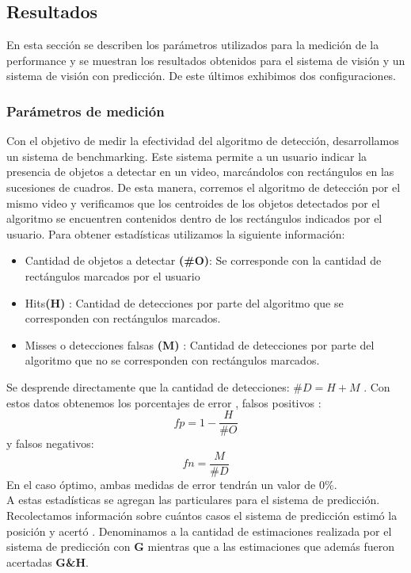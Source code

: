 	
	
\subsection{Resultados}
En esta sección se describen los parámetros utilizados para la 
medición de la performance y se muestran los resultados obtenidos para 
el sistema de visión y un sistema de visión con predicción. De este 
últimos exhibimos dos configuraciones.

\subsubsection{Parámetros de medición}
Con el objetivo de  medir la efectividad del algoritmo de detección, desarrollamos un sistema de benchmarking. Este sistema permite
a un usuario indicar la presencia de objetos a detectar en un video, marcándolos con rectángulos en las sucesiones de cuadros. De esta
manera, corremos el algoritmo de detección por el mismo video y verificamos que los centroides de los objetos detectados por el algoritmo 
se encuentren contenidos dentro de los rectángulos indicados por el 
usuario.  Para obtener estadísticas utilizamos la siguiente información:
\begin{itemize}
\item { Cantidad de objetos a detectar \textbf{(\#O)}: Se corresponde con la cantidad de rectángulos marcados por el usuario}
\item { Hits\textbf{(H)} : Cantidad de detecciones por parte del algoritmo que se corresponden con rectángulos marcados.}
\item { Misses o detecciones falsas \textbf{(M)} : Cantidad de detecciones por parte del algoritmo que no se corresponden con rectángulos marcados.}
\end{itemize}
Se desprende directamente que la cantidad de detecciones: 
\textbf{$\#D=H+M$} .
Con estos datos obtenemos los porcentajes de error , falsos positivos : 
\[
	fp=1 - \frac{H}{\# O}
\]
y falsos negativos:
\[
	fn=\frac{M}{\# D}
\]
En el caso óptimo, ambas medidas de error tendrán un valor de $0\%$.  \\
\indent A estas estadísticas se agregan las particulares para el sistema de predicción. Recolectamos información sobre
cuántos casos el sistema de predicción estimó la posición y acertó . Denominamos
a la cantidad de estimaciones realizada por el sistema de predicción 
con \textbf{G} mientras que a las estimaciones que además fueron 
acertadas \textbf{G\&H}.

